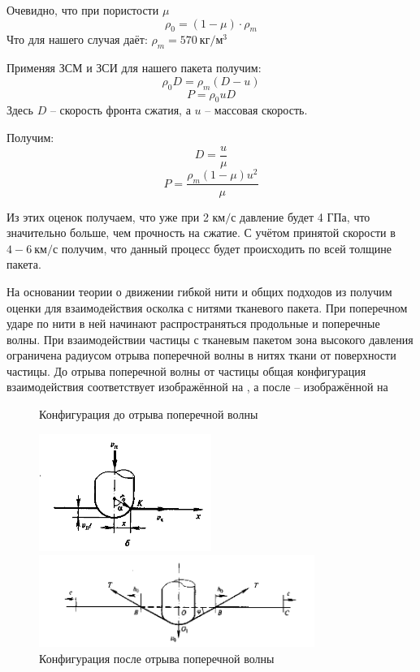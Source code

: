 Очевидно, что при пористости $\mu$
\begin{equation}
    \rho_0 = (1 - \mu) \cdot \rho_m
\end{equation}
Что для нашего случая даёт: $\rho_m = 570~кг / м^3$

Применяя ЗСМ и ЗСИ для нашего пакета получим:
\begin{equation}
    \rho_0 D = \rho_m (D - u)
\end{equation}
\begin{equation}
    P = \rho_0 u D
\end{equation}
Здесь $D$ -- скорость фронта сжатия, а $u$ -- массовая скорость.

Получим:
\begin{equation}
    D = \frac{u}{\mu}
\end{equation}
\begin{equation}
    P = \frac{\rho_m (1 - \mu) u ^2}{\mu}
\end{equation}

Из этих оценок получаем, что уже при 2 $км/с$ давление будет 4 ГПа, что значительно больше, чем прочность на сжатие.
С учётом принятой скорости в $4-6~км/с$ получим, что данный процесс будет происходить по всей толщине пакета.

На основании теории о движении гибкой нити \cite{rakhmatulin} и общих подходов из \cite{kobylkin2014} получим оценки для взаимодействия
осколка с нитями тканевого пакета.
При поперечном ударе по нити в ней начинают распространяться продольные и поперечные волны.
При взаимодействии частицы с тканевым пакетом зона высокого давления ограничена радиусом отрыва поперечной волны
в нитях ткани от поверхности частицы.
До отрыва поперечной волны от частицы общая конфигурация взаимодействия соответствует изображённой на
, а после -- изображённой на 

\begin{figure}[H]
    \centering

    \caption{Конфигурация до отрыва поперечной волны}
    \label{fig:first-stage}
    \includegraphics[width=0.5\textwidth]{img/first_stage.png}

    \caption{Конфигурация после отрыва поперечной волны}
    \label{fig:second-stage}
    \includegraphics[width=0.8\textwidth]{img/second_stage.png}
\end{figure}

